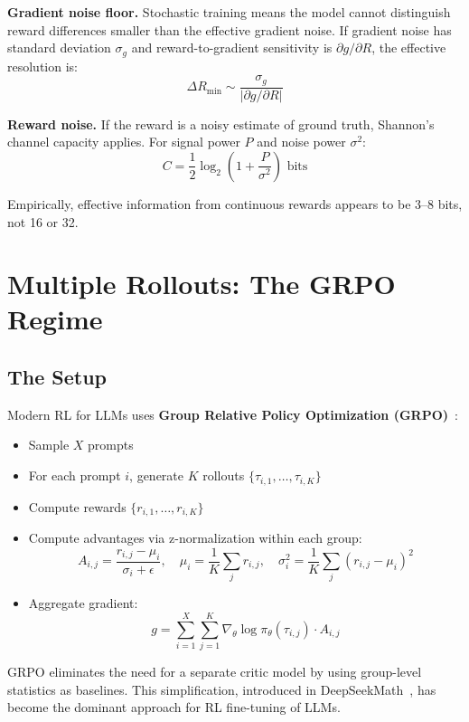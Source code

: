 \documentclass[11pt,a4paper]{article}
\theoremstyle{definition}
\theoremstyle{remark}
\begin{document}
\textbf{Gradient noise floor.} Stochastic training means the model cannot distinguish reward differences smaller than the effective gradient noise. If gradient noise has standard deviation $\sigma_g$ and reward-to-gradient sensitivity is $\partial g / \partial R$, the effective resolution is:
\[
\Delta R_{\text{min}} \sim \frac{\sigma_g}{|\partial g / \partial R|}
\]

\textbf{Reward noise.} If the reward is a noisy estimate of ground truth, Shannon's channel capacity applies. For signal power $P$ and noise power $\sigma^2$:
\[
C = \frac{1}{2} \log_2\left(1 + \frac{P}{\sigma^2}\right) \text{ bits}
\]

Empirically, effective information from continuous rewards appears to be 3--8 bits, not 16 or 32.

\section{Multiple Rollouts: The GRPO Regime}

\subsection{The Setup}

Modern RL for LLMs uses \textbf{Group Relative Policy Optimization (GRPO)}~\cite{deepseekmath}:
\begin{itemize}
    \item Sample $X$ prompts
    \item For each prompt $i$, generate $K$ rollouts $\{\tau_{i,1}, \ldots, \tau_{i,K}\}$
    \item Compute rewards $\{r_{i,1}, \ldots, r_{i,K}\}$
    \item Compute advantages via z-normalization within each group:
    \[
    A_{i,j} = \frac{r_{i,j} - \mu_i}{\sigma_i + \epsilon}, \quad \mu_i = \frac{1}{K}\sum_j r_{i,j}, \quad \sigma_i^2 = \frac{1}{K}\sum_j (r_{i,j} - \mu_i)^2
    \]
    \item Aggregate gradient:
    \[
    g = \sum_{i=1}^{X} \sum_{j=1}^{K} \nabla_\theta \log \pi_\theta(\tau_{i,j}) \cdot A_{i,j}
    \]
\end{itemize}

GRPO eliminates the need for a separate critic model by using group-level statistics as baselines. This simplification, introduced in DeepSeekMath~\cite{deepseekmath}, has become the dominant approach for RL fine-tuning of LLMs.
\end{document}
